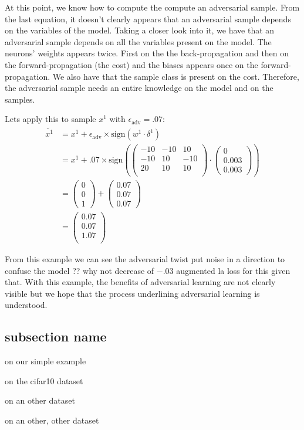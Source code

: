 		At this point, we know how to compute the compute an adversarial sample. From the last equation, it doesn't clearly appears that an adversarial sample depends on the variables of the model. Taking a closer look into it, we have that an adversarial sample depends on all the variables present on the model. The neurons' weights appears twice. First on the the back-propagation and then on the forward-propagation (the cost) and the biases appears once on the forward-propagation. We also have that the sample class is present on the cost. Therefore, the adversarial sample needs an entire knowledge on the model and on the samples.

		Lets apply this to sample $x^1$ with $\epsilon_{\text{adv}} = .07$:
		\begin{equation}
			\begin{split}
				\widetilde{x^1}
				&= x^1 + \epsilon_{\text{adv}} \times \text{sign}( w^1 \cdot \delta^1 ) \\
				&= x^1 + .07 \times \text{sign}
				\left( \left( \begin{matrix}
				-10 	& -10 	& 10 \\
				-10 	& 10 	& -10 \\
				20 		& 10 	& 10 \\
				\end{matrix} \right) \cdot
				\left( \begin{matrix}0 \\ 0.003 \\0.003  \end{matrix} \right) \right)\\
				&= \left( \begin{matrix} 0 \\   0 \\ 1  \end{matrix} \right) +
				\left( \begin{matrix}0.07 \\0.07 \\0.07 \end{matrix} \right) \\
				&= \left( \begin{matrix}0.07 \\0.07 \\1.07 \\\end{matrix} \right)
			\end{split}
		\end{equation}

		From this example we can see the adversarial twist put noise in a direction to confuse the model ?? why not decrease of $-.03$ augmented la loss for this given that.
		With this example, the benefits of adversarial learning are not clearly visible but we hope that the process underlining adversarial learning is understood.









	\subsection{subsection name} %
	\label{sub:subsection_name}
	
	on our simple example

	on the cifar10 dataset

	on an other dataset

	on an other, other dataset

